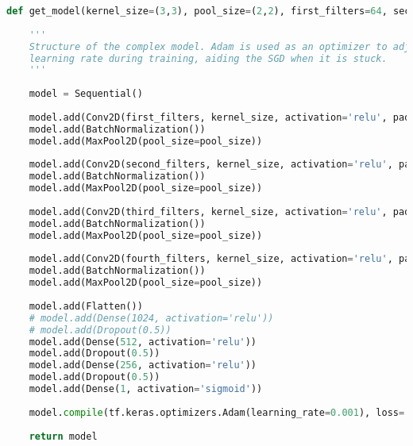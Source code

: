\begin{lstlisting}[language=Python, caption=Model 2]
def get_model(kernel_size=(3,3), pool_size=(2,2), first_filters=64, second_filters=128, third_filters=256, fourth_filters=1024):
    
    '''
    Structure of the complex model. Adam is used as an optimizer to adjust the 
    learning rate during training, aiding the SGD when it is stuck.
    ''' 
    
    model = Sequential()    
    
    model.add(Conv2D(first_filters, kernel_size, activation='relu', padding='same', input_shape=(IMAGE_SIZE, IMAGE_SIZE, 3)))
    model.add(BatchNormalization())
    model.add(MaxPool2D(pool_size=pool_size))
    
    model.add(Conv2D(second_filters, kernel_size, activation='relu', padding='same'))
    model.add(BatchNormalization())
    model.add(MaxPool2D(pool_size=pool_size))
    
    model.add(Conv2D(third_filters, kernel_size, activation='relu', padding='same'))
    model.add(BatchNormalization())
    model.add(MaxPool2D(pool_size=pool_size))
    
    model.add(Conv2D(fourth_filters, kernel_size, activation='relu', padding='same'))
    model.add(BatchNormalization())
    model.add(MaxPool2D(pool_size=pool_size))
    
    model.add(Flatten())
    # model.add(Dense(1024, activation='relu'))
    # model.add(Dropout(0.5))
    model.add(Dense(512, activation='relu'))
    model.add(Dropout(0.5))
    model.add(Dense(256, activation='relu'))
    model.add(Dropout(0.5))
    model.add(Dense(1, activation='sigmoid'))
    
    model.compile(tf.keras.optimizers.Adam(learning_rate=0.001), loss='binary_crossentropy', metrics=['accuracy'])
    
    return model
\end{lstlisting}